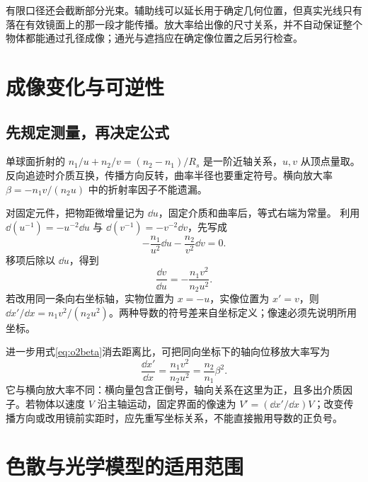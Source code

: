 有限口径还会截断部分光束。辅助线可以延长用于确定几何位置，但真实光线只有落在有效镜面上的那一段才能传播。放大率给出像的尺寸关系，并不自动保证整个物体都能通过孔径成像；通光与遮挡应在确定像位置之后另行检查。

\section{成像变化与可逆性}

\subsection{先规定测量，再决定公式}

单球面折射的 \(n_1/u+n_2/v=(n_2-n_1)/R_s\) 是一阶近轴关系，\(u,v\) 从顶点量取。反向追迹时介质互换，传播方向反转，曲率半径也要重定符号。横向放大率
\(\beta=-n_1v/(n_2u)\) 中的折射率因子不能遗漏。

对固定元件，把物距微增量记为 \(\dd u\)，固定介质和曲率后，等式右端为常量。
利用 $\dd(u^{-1})=-u^{-2}\dd u$ 与 $\dd(v^{-1})=-v^{-2}\dd v$，先写成
\[
 -\frac{n_1}{u^2}\dd u-\frac{n_2}{v^2}\dd v=0.
\]
移项后除以 $\dd u$，得到
\[
 \frac{\dd v}{\dd u}=-\frac{n_1v^2}{n_2u^2}.
\]
若改用同一条向右坐标轴，实物位置为 \(x=-u\)，实像位置为 \(x'=v\)，则
\(\dd x'/\dd x=n_1v^2/(n_2u^2)\)。两种导数的符号差来自坐标定义；像速必须先说明所用坐标。

进一步用式\eqref{eq:o2beta}消去距离比，可把同向坐标下的轴向位移放大率写为
\[
\frac{\dd x'}{\dd x}=\frac{n_1v^2}{n_2u^2}
=\frac{n_2}{n_1}\beta^2.
\]
它与横向放大率不同：横向量包含正倒号，轴向关系在这里为正，且多出介质因子。若物体以速度 $V$ 沿主轴运动，固定界面的像速为 $V'=(\dd x'/\dd x)V$；改变传播方向或改用镜前实距时，应先重写坐标关系，不能直接搬用导数的正负号。


\section{色散与光学模型的适用范围}

